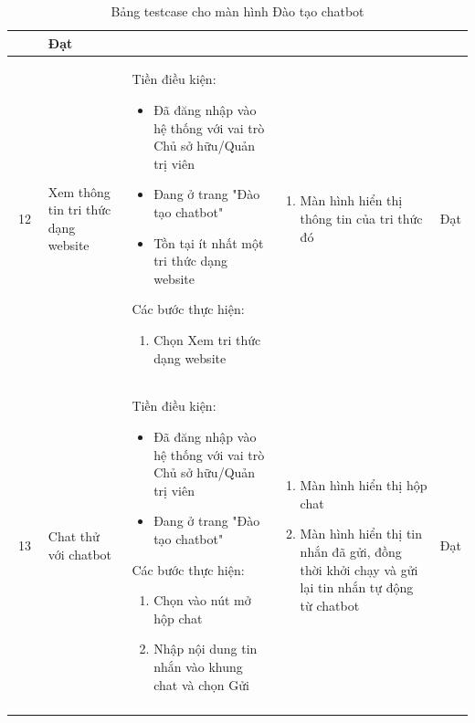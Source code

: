 \begin{longtable}{|c|m{2.5cm}|m{5.5cm}|m{4.5cm}|c|}
\begin{enumerate}[label=\arabic*.]
    \end{enumerate}  & Đạt \\
    \hline
    12 & 
    Xem thông tin tri thức dạng website & 
    Tiền điều kiện:
    \begin{itemize}
        \item Đã đăng nhập vào hệ thống với vai trò Chủ sở hữu/Quản trị viên
        \item Đang ở trang "Đào tạo chatbot"
        \item Tồn tại ít nhất một tri thức dạng website
    \end{itemize}
    Các bước thực hiện: 
    \begin{enumerate}[label=\arabic*.]
        \item Chọn Xem tri thức dạng website
    \end{enumerate}
    & 
    \begin{enumerate}[label=\arabic*.]
        \item Màn hình hiển thị thông tin của tri thức đó
    \end{enumerate}  & Đạt \\
    \hline
    13 & 
    Chat thử với chatbot & 
    Tiền điều kiện:
    \begin{itemize}
        \item Đã đăng nhập vào hệ thống với vai trò Chủ sở hữu/Quản trị viên
        \item Đang ở trang "Đào tạo chatbot"
    \end{itemize}
    Các bước thực hiện: 
    \begin{enumerate}[label=\arabic*.]
        \item Chọn vào nút mở hộp chat
        \item Nhập nội dung tin nhắn vào khung chat và chọn Gửi
    \end{enumerate}
    & 
    \begin{enumerate}[label=\arabic*.]
        \item Màn hình hiển thị hộp chat
        \item Màn hình hiển thị tin nhắn đã gửi, đồng thời khởi chạy và gửi lại tin nhắn tự động từ chatbot
    \end{enumerate}& Đạt \\
    \hline
    \caption{Bảng testcase cho màn hình Đào tạo chatbot}
    \end{longtable}